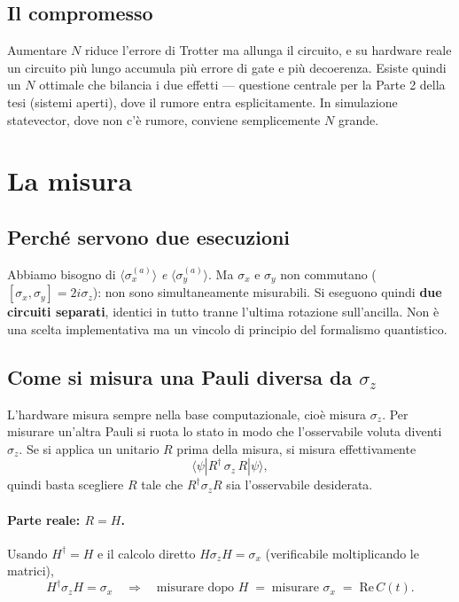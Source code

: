 \documentclass[11pt,a4paper]{article}
\begin{document}
\subsection{Il compromesso}

Aumentare $N$ riduce l'errore di Trotter ma allunga il circuito, e su hardware reale un circuito
più lungo accumula più errore di gate e più decoerenza. Esiste quindi un $N$ ottimale che
bilancia i due effetti --- questione centrale per la Parte 2 della tesi (sistemi aperti), dove il
rumore entra esplicitamente. In simulazione statevector, dove non c'è rumore, conviene
semplicemente $N$ grande.

\section{La misura}

\subsection{Perché servono due esecuzioni}

Abbiamo bisogno di $\langle\sigma_x^{(a)}\rangle$ \emph{e} $\langle\sigma_y^{(a)}\rangle$. Ma
$\sigma_x$ e $\sigma_y$ non commutano ($[\sigma_x,\sigma_y]=2i\sigma_z$): non sono
simultaneamente misurabili. Si eseguono quindi \textbf{due circuiti separati}, identici in tutto
tranne l'ultima rotazione sull'ancilla. Non è una scelta implementativa ma un vincolo di
principio del formalismo quantistico.

\subsection{Come si misura una Pauli diversa da $\sigma_z$}

L'hardware misura sempre nella base computazionale, cioè misura $\sigma_z$. Per misurare
un'altra Pauli si ruota lo stato in modo che l'osservabile voluta diventi $\sigma_z$. Se si
applica un unitario $R$ prima della misura, si misura effettivamente
\begin{equation}
\langle\psi|R^\dagger\,\sigma_z\,R|\psi\rangle,
\end{equation}
quindi basta scegliere $R$ tale che $R^\dagger\sigma_z R$ sia l'osservabile desiderata.

\paragraph{Parte reale: $R=H$.} Usando $H^\dagger=H$ e il calcolo diretto
$H\sigma_z H=\sigma_x$ (verificabile moltiplicando le matrici),
\begin{equation}
H^\dagger\sigma_z H=\sigma_x
\quad\Longrightarrow\quad
\text{misurare dopo }H \;=\; \text{misurare }\sigma_x \;=\; \mathrm{Re}\,C(t).
\end{equation}
\end{document}
